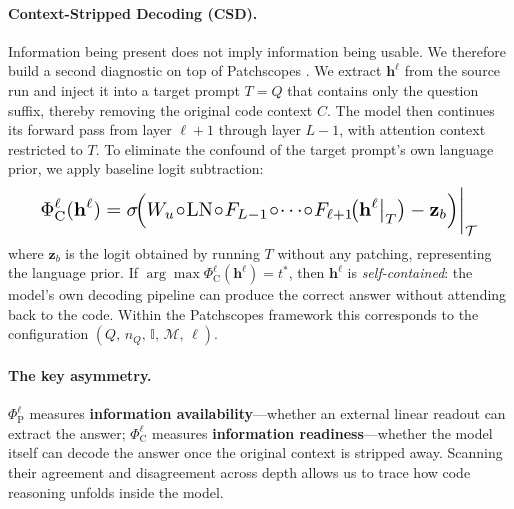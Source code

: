
\paragraph{Context-Stripped Decoding (CSD).}
Information being present does not imply information being usable. We therefore build a second diagnostic on top of Patchscopes \citep{ghandeharioun2024patchscopes}. We extract $\mathbf{h}^\ell$ from the source run and inject it into a target prompt $T = Q$ that contains only the question suffix, thereby removing the original code context $C$. The model then continues its forward pass from layer $\ell{+}1$ through layer $L{-}1$, with attention context restricted to $T$. To eliminate the confound of the target prompt's own language prior, we apply baseline logit subtraction:
%
\begin{equation}
\label{eq:csd}
\resizebox{0.91\columnwidth}{!}{$\displaystyle
\Phi_{\mathrm{C}}^\ell(\mathbf{h}^\ell) = \sigma\!\Big(W_u \!\circ\! \mathrm{LN} \!\circ\! F_{L-1} \!\circ\! \cdots \!\circ\! F_{\ell+1}\!\big(\mathbf{h}^\ell\big|_T\big) - \mathbf{z}_b\Big)\bigg|_{\mathcal{T}}
$}
\end{equation}
%
where $\mathbf{z}_b$ is the logit obtained by running $T$ without any patching, representing the language prior. If $\arg\max \Phi_{\mathrm{C}}^\ell(\mathbf{h}^\ell) = t^*$, then $\mathbf{h}^\ell$ is \emph{self-contained}: the model's own decoding pipeline can produce the correct answer without attending back to the code. Within the Patchscopes framework this corresponds to the configuration $(Q,\, n_Q,\, \mathbb{I},\, \mathcal{M},\, \ell)$.


\paragraph{The key asymmetry.}
$\Phi_{\mathrm{P}}^\ell$ measures \textbf{information availability}---whether an external linear readout can extract the answer; $\Phi_{\mathrm{C}}^\ell$ measures \textbf{information readiness}---whether the model itself can decode the answer once the original context is stripped away. Scanning their agreement and disagreement across depth allows us to trace how code reasoning unfolds inside the model.
